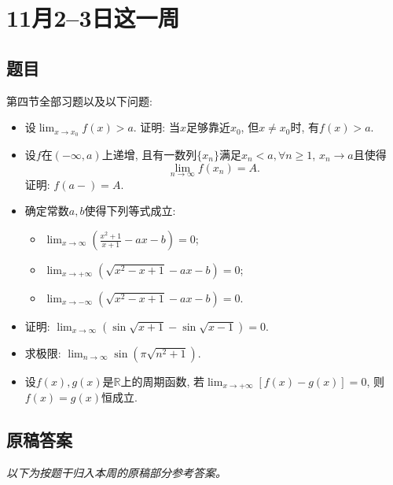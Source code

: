 \documentclass[UTF8,11pt, a4paper, oneside, fontset=none]{ctexbook}
\begin{document}
\section{11月2--3日这一周}

\subsection*{题目}

第四节全部习题以及以下问题:

\begin{itemize}

\item[1.] 设$\lim_{x \to x_0}f(x) > a $. 证明: 当$x$足够靠近$x_0$, 但$x \neq x_0$时, 有$f(x) >a$.

\item[2.] 设$f$在$(-\infty, a)$上递增, 且有一数列$\{x_n\}$满足$x_n < a, \forall n \geq 1$, $x _n \to a$且使得
\[
\lim_{n \to \infty}f(x_n) =A.
\]
证明: $f(a-)=A$.

\item[3.] 确定常数$a, b$使得下列等式成立:

\begin{itemize}
\item[(1)] $\lim_{x \to \infty} \left( \frac{x^2 +1}{x+1} - ax -b \right)=0$;
\item[(2)] $\lim_{x \to +\infty}(\sqrt{x^2-x+1} -ax -b)=0$;
\item[(3)] $\lim_{x \to -\infty}(\sqrt{x^2-x+1} -ax -b)=0$.
\end{itemize}

\item[4.] 证明: $\lim_{x \to \infty}(\sin \sqrt{x+1} - \sin \sqrt{x-1}) =0$.

\item[5.] 求极限: $\lim_{n \to \infty} \sin(\pi \sqrt{n^2+1})$.

\item[6.] 设$f(x), g(x)$是$\mathbb R$上的周期函数, 若$\lim_{x \to +\infty}[f(x) -g(x)] =0$, 则$f(x) = g(x)$恒成立.

\end{itemize}

\clearpage

\subsection*{原稿答案}

\noindent\emph{以下为按题干归入本周的原稿部分参考答案。}
\end{document}
